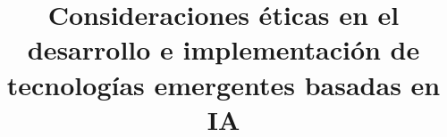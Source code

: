 \documentclass{layout/epfl-report}
\begin{document}
\frontmatter

\title{Consideraciones éticas en el desarrollo e implementación de tecnologías emergentes basadas en IA}

\subject{Grupo de Estudio: Ética en Tecnologías Emergentes Basadas en AI} %


\makecover


%


\tableofcontents




\mainmatter























%

\setcounter{biburlnumpenalty}{7000}
\setcounter{biburllcpenalty}{7000}
\setcounter{biburlucpenalty}{7000}



\appendix



\end{document}
